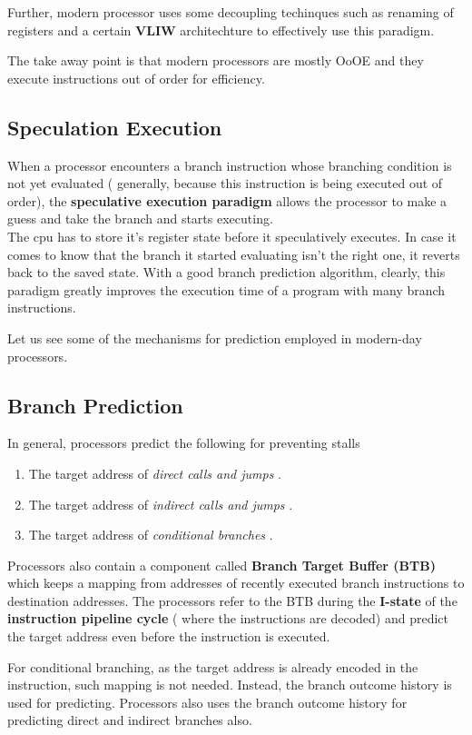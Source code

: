 \documentclass[12pt]{article}
\begin{document}
\begin{appendices}
	Further, modern processor uses some decoupling techinques such as renaming of registers and a certain \textbf{VLIW} architechture to effectively use this paradigm.
	
	The take away point is that modern processors are mostly OoOE and they execute instructions out of order for efficiency. 
	
	\subsection{Speculation Execution}
	
	When a processor encounters a branch instruction whose branching condition is not yet evaluated ( generally, because this instruction is being executed out of order), the \textbf{speculative execution paradigm} allows the processor to make a guess and take the branch and starts executing. \\
	The cpu has to store it's register state before it speculatively executes. In case it comes to know that the branch it started evaluating isn't the right one, it reverts back to the saved state. With a good branch prediction algorithm, clearly, this paradigm greatly improves the execution time of a program with many branch instructions. 
	
	Let us see some of the mechanisms for prediction employed in modern-day processors.  
	
	\subsection{Branch Prediction}
	In general, processors predict the following for preventing stalls 
	\begin{enumerate}
		\item The target address of \textit{ direct calls and jumps }.  
		\item The target address of \textit{ indirect calls and jumps }.
		\item The target address of \textit{ conditional branches }.
	\end{enumerate}
	Processors also contain a component called \textbf{Branch Target Buffer (BTB) } which keeps a mapping from addresses of recently executed branch instructions to destination addresses. The processors refer to the BTB during the \textbf{I-state} of the \textbf{instruction pipeline cycle} ( where the instructions are decoded) and predict the target address even before the instruction is executed.
	
	For conditional branching, as the target address is already encoded in the instruction, such mapping is not needed. Instead, the branch outcome history is used for predicting. Processors also uses the branch outcome history for predicting direct and indirect branches also. 
	

\end{appendices}
\end{document}
